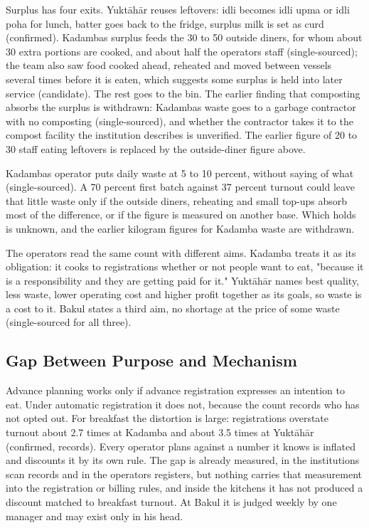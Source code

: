 \documentclass[
  10pt,
  table]{article}
\begin{document}
Surplus has four exits. Yuktāhār reuses leftovers: idli becomes idli upma or idli poha for lunch, batter goes back to the fridge, surplus milk is set as curd (confirmed). Kadamba\textquotesingle s surplus feeds the 30 to 50 outside diners, for whom about 30 extra portions are cooked, and about half the operator\textquotesingle s staff (single-sourced); the team also saw food cooked ahead, reheated and moved between vessels several times before it is eaten, which suggests some surplus is held into later service (candidate). The rest goes to the bin. The earlier finding that composting absorbs the surplus is withdrawn: Kadamba\textquotesingle s waste goes to a garbage contractor with no composting (single-sourced), and whether the contractor takes it to the compost facility the institution describes is unverified. The earlier figure of 20 to 30 staff eating leftovers is replaced by the outside-diner figure above.

Kadamba\textquotesingle s operator puts daily waste at 5 to 10 percent, without saying of what (single-sourced). A 70 percent first batch against 37 percent turnout could leave that little waste only if the outside diners, reheating and small top-ups absorb most of the difference, or if the figure is measured on another base. Which holds is unknown, and the earlier kilogram figures for Kadamba waste are withdrawn.

The operators read the same count with different aims. Kadamba treats it as its obligation: it cooks to registrations whether or not people want to eat, "because it is a responsibility and they are getting paid for it." Yuktāhār names best quality, less waste, lower operating cost and higher profit together as its goals, so waste is a cost to it. Bakul states a third aim, no shortage at the price of some waste (single-sourced for all three).

\subsection{Gap Between Purpose and Mechanism}\label{gap-between-purpose-and-mechanism}

Advance planning works only if advance registration expresses an intention to eat. Under automatic registration it does not, because the count records who has not opted out. For breakfast the distortion is large: registrations overstate turnout about 2.7 times at Kadamba and about 3.5 times at Yuktāhār (confirmed, records). Every operator plans against a number it knows is inflated and discounts it by its own rule. The gap is already measured, in the institution\textquotesingle s scan records and in the operators\textquotesingle{} registers, but nothing carries that measurement into the registration or billing rules, and inside the kitchens it has not produced a discount matched to breakfast turnout. At Bakul it is judged weekly by one manager and may exist only in his head.
\end{document}
